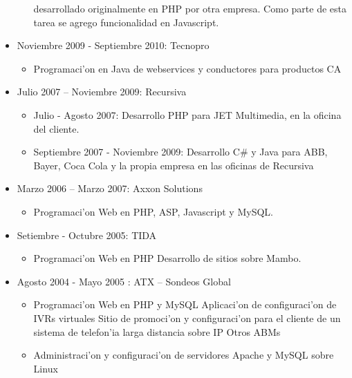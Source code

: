 \begin{itemize}
\begin{itemize}
				desarrollado originalmente en PHP por otra empresa.  Como parte de esta tarea se
				agrego funcionalidad en Javascript.
		\end{itemize}
	\item Noviembre 2009 - Septiembre 2010: Tecnopro
		\begin{itemize}
			\item Programaci'on en Java de webservices y conductores para productos CA
		\end{itemize}
	\item Julio 2007 -- Noviembre 2009: Recursiva
		\begin{itemize}
			\item Julio - Agosto 2007: Desarrollo PHP para JET Multimedia,
				en la oficina del cliente.
			\item Septiembre 2007 - Noviembre 2009: Desarrollo C\# y Java para ABB,
				Bayer, Coca Cola y la propia empresa en las oficinas de
				Recursiva
		\end{itemize}
	\item Marzo 2006 -- Marzo 2007: Axxon Solutions
		\begin{itemize}
			\item Programaci'on Web en PHP, ASP, Javascript y MySQL.
		\end{itemize}
	\item Setiembre - Octubre 2005: TIDA
		\begin{itemize}
			\item Programaci'on Web en PHP
				\subitem Desarrollo de sitios sobre Mambo.
		\end{itemize}
		\pagebreak
	\item Agosto 2004 - Mayo 2005 : ATX -- Sondeos Global
		\begin{itemize}
			\item Programaci'on Web en PHP y MySQL
				\subitem Aplicaci'on de configuraci'on de IVRs virtuales
				\subitem Sitio de promoci'on y configuraci'on para el
				cliente de un sistema de telefon'ia larga distancia sobre IP
				\subitem Otros ABMs
			\item Administraci'on y configuraci'on de servidores Apache y MySQL sobre Linux
		\end{itemize}
\end{itemize}
